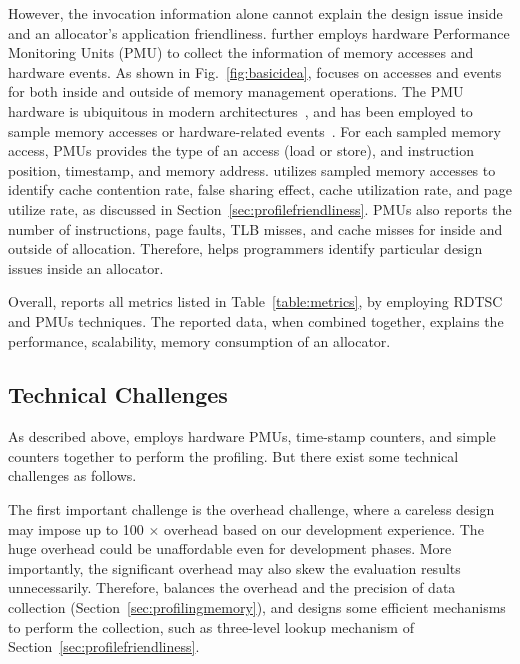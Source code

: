 However, the invocation information alone cannot  explain the design issue inside and an allocator's application friendliness. \MP{} further employs hardware Performance Monitoring Units (PMU) to collect the information of memory accesses and hardware events. As shown in Fig.~\ref{fig:basicidea}, \MP{} focuses on accesses and events for both inside and outside of memory management operations. The PMU hardware is ubiquitous in modern architectures~\cite{AMDIBS:07, IntelArch:PEBS:Sept09, armpmu}, and has been  employed to sample memory accesses or hardware-related events~\cite{DBLP:conf/sc/ItzkowitzWAK03, ibs-sc, Sheng:2011:RLN:1985793.1985848}.
For each sampled memory access, PMUs provides the type of an access (load or store), and instruction position, timestamp, and memory address. \MP{} utilizes sampled memory accesses to identify cache contention rate, false sharing effect, cache utilization rate, and page utilize rate, as discussed in Section~\ref{sec:profilefriendliness}. PMUs also reports the number of instructions, page faults, TLB misses, and cache misses for inside and outside of allocation. Therefore, \MP{} helps programmers identify particular design issues inside an allocator. 

Overall, \MP{} reports all metrics listed in Table~\ref{table:metrics}, by employing  RDTSC and PMUs techniques. The reported data, when combined together, explains the performance, scalability, memory consumption of an allocator. 

\subsection{Technical Challenges}

As described above, \MP{} employs hardware PMUs, time-stamp counters, and simple counters together to perform the profiling. But there exist some technical challenges as follows. 

The first important challenge is the overhead challenge, where a careless design may impose up to 100 $\times$ overhead based on our development experience. The huge overhead could be unaffordable even for development phases. More importantly, the significant overhead may also skew the evaluation results unnecessarily. Therefore, \MP{} balances the overhead and the precision of data collection (Section~\ref{sec:profilingmemory}), and designs some efficient mechanisms to perform the collection, such as three-level lookup mechanism of Section~\ref{sec:profilefriendliness}. 

